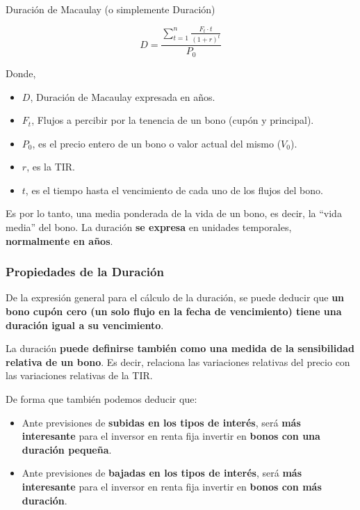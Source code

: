 \documentclass[
  letterpaper,
  DIV=11,
  numbers=noendperiod]{scrreprt}
\begin{document}
\begin{tcolorbox}
\begin{tcolorbox}[enhanced jigsaw, toprule=.15mm, left=2mm, arc=.35mm, breakable, bottomrule=.15mm, opacityback=0, rightrule=.15mm, leftrule=.75mm, colframe=quarto-callout-note-color-frame, colback=white]
\begin{minipage}[t]{\textwidth - 5.5mm}
Duración de Macaulay (o simplemente Duración)

\[D=\frac{\sum_{t=1}^{n}\frac{F_t\cdot t}{\left(1+r\right)^t}}{P_0}\]

Donde,

\begin{itemize}
\item
  \(D\), Duración de Macaulay expresada en años.
\item
  \(F_t\), Flujos a percibir por la tenencia de un bono (cupón y
  principal).
\item
  \(P_0\), es el precio entero de un bono o valor actual del mismo
  (\(V_0\)).
\item
  \(r\), es la TIR.
\item
  \(t\), es el tiempo hasta el vencimiento de cada uno de los flujos del
  bono.
\end{itemize}

\end{minipage}%
\end{tcolorbox}

Es por lo tanto, una media ponderada de la vida de un bono, es decir, la
``vida media'' del bono. La duración \textbf{se expresa} en unidades
temporales, \textbf{normalmente en años}.

\subsubsection{Propiedades de la
Duración}\label{propiedades-de-la-duraciuxf3n}

De la expresión general para el cálculo de la duración, se puede deducir
que \textbf{un bono cupón cero (un solo flujo en la fecha de
vencimiento) tiene una duración igual a su vencimiento}.

La duración \textbf{puede definirse también como una medida de la
sensibilidad relativa de un bono}. Es decir, relaciona las variaciones
relativas del precio con las variaciones relativas de la TIR.

De forma que también podemos deducir que:

\begin{itemize}
\item
  Ante previsiones de \textbf{subidas en los tipos de interés}, será
  \textbf{más interesante} para el inversor en renta fija invertir en
  \textbf{bonos con una duración pequeña}.
\item
  Ante previsiones de \textbf{bajadas en los tipos de interés}, será
  \textbf{más interesante} para el inversor en renta fija invertir en
  \textbf{bonos con más duración}.
\end{itemize}


\end{tcolorbox}
\end{document}

